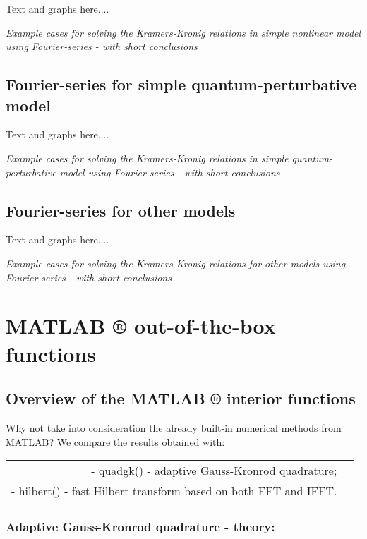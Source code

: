 \documentclass[12pt,twoside,a4paper]{article}
\numberwithin{equation}{subsection}
\numberwithin{figure}{subsection}
\begin{document}
Text and graphs here.... 

\textit{Example cases for solving the Kramers-Kronig relations in simple nonlinear model using Fourier-series - with short
conclusions}

\subsection{Fourier-series for simple quantum-perturbative model} \label{chap:fourier_quantum}

Text and graphs here.... 

\textit{Example cases for solving the Kramers-Kronig relations in simple quantum-perturbative model using Fourier-series - with
short conclusions}

\subsection{Fourier-series for other models} \label{chap:fourier_other}

Text and graphs here.... 

\textit{Example cases for solving the Kramers-Kronig relations for other models using Fourier-series - with short conclusions}

\section{MATLAB ® out-of-the-box functions} \label{chap:matlab}

\subsection{Overview of the MATLAB ® interior functions} \label{chap:matlab_overview}

Why not take into consideration the already built-in numerical methods from MATLAB? We compare the results obtained with: 
\begin{tabular}{r l}
  - quadgk() - adaptive Gauss-Kronrod quadrature; \\
  - hilbert() - fast Hilbert transform based on both FFT and IFFT. \\
\end{tabular}

\subsubsection*{Adaptive Gauss-Kronrod quadrature - theory:}
\end{document}
